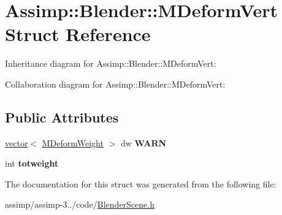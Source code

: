 \hypertarget{struct_assimp_1_1_blender_1_1_m_deform_vert}{\section{Assimp\+:\+:Blender\+:\+:M\+Deform\+Vert Struct Reference}
\label{struct_assimp_1_1_blender_1_1_m_deform_vert}
}


Inheritance diagram for Assimp\+:\+:Blender\+:\+:M\+Deform\+Vert\+:


Collaboration diagram for Assimp\+:\+:Blender\+:\+:M\+Deform\+Vert\+:
\subsection*{Public Attributes}
\begin{DoxyCompactItemize}
\item 
\hypertarget{struct_assimp_1_1_blender_1_1_m_deform_vert_a8da5ccb9214a4e4536dbeb840394afd0}{\hyperlink{class_assimp_1_1_blender_1_1vector}{vector}$<$ \hyperlink{struct_assimp_1_1_blender_1_1_m_deform_weight}{M\+Deform\+Weight} $>$ dw {\bfseries W\+A\+R\+N}}\label{struct_assimp_1_1_blender_1_1_m_deform_vert_a8da5ccb9214a4e4536dbeb840394afd0}

\item 
\hypertarget{struct_assimp_1_1_blender_1_1_m_deform_vert_a19eb60e40b82f0887841b1fbb1c80f6a}{int {\bfseries totweight}}\label{struct_assimp_1_1_blender_1_1_m_deform_vert_a19eb60e40b82f0887841b1fbb1c80f6a}

\end{DoxyCompactItemize}


The documentation for this struct was generated from the following file\+:\begin{DoxyCompactItemize}
\item 
assimp/assimp-\/3../code/\hyperlink{_blender_scene_8h}{Blender\+Scene.\+h}\end{DoxyCompactItemize}
